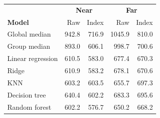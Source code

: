 \begin{tabular}{lrrrr}
\hline
 & \multicolumn{2}{c}{\textbf{Near}} & \multicolumn{2}{c}{\textbf{Far}} \\
\textbf{Model} & Raw & Index & Raw & Index \\
\hline
Global median & 942.8 & 716.9 & 1045.9 & 810.0 \\
Group median & 893.0 & 606.1 & 998.7 & 700.6 \\
Linear regression & 610.5 & 583.0 & 677.4 & 670.3 \\
Ridge & 610.9 & 583.2 & 678.1 & 670.6 \\
KNN & 603.2 & 603.5 & 655.7 & 697.3 \\
Decision tree & 640.4 & 602.2 & 683.3 & 695.6 \\
Random forest & 602.2 & 576.7 & 650.2 & 668.2 \\
\hline
\end{tabular}
